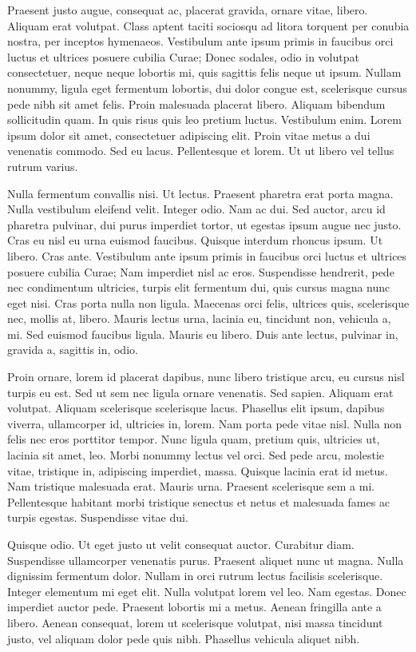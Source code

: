 \documentclass[article,colorback,accentcolor=tud4c]{tudreport}
\begin{document}
    Praesent justo augue, consequat ac, placerat gravida, ornare vitae, libero. Aliquam erat volutpat. Class aptent taciti sociosqu ad litora torquent per conubia nostra, per inceptos hymenaeos. Vestibulum ante ipsum primis in faucibus orci luctus et ultrices posuere cubilia Curae; Donec sodales, odio in volutpat consectetuer, neque neque lobortis mi, quis sagittis felis neque ut ipsum. Nullam nonummy, ligula eget fermentum lobortis, dui dolor congue est, scelerisque cursus pede nibh sit amet felis. Proin malesuada placerat libero. Aliquam bibendum sollicitudin quam. In quis risus quis leo pretium luctus. Vestibulum enim. Lorem ipsum dolor sit amet, consectetuer adipiscing elit. Proin vitae metus a dui venenatis commodo. Sed eu lacus. Pellentesque et lorem. Ut ut libero vel tellus rutrum varius.

    Nulla fermentum convallis nisi. Ut lectus. Praesent pharetra erat porta magna. Nulla vestibulum eleifend velit. Integer odio. Nam ac dui. Sed auctor, arcu id pharetra pulvinar, dui purus imperdiet tortor, ut egestas ipsum augue nec justo. Cras eu nisl eu urna euismod faucibus. Quisque interdum rhoncus ipsum. Ut libero. Cras ante. Vestibulum ante ipsum primis in faucibus orci luctus et ultrices posuere cubilia Curae; Nam imperdiet nisl ac eros. Suspendisse hendrerit, pede nec condimentum ultricies, turpis elit fermentum dui, quis cursus magna nunc eget nisi. Cras porta nulla non ligula. Maecenas orci felis, ultrices quis, scelerisque nec, mollis at, libero. Mauris lectus urna, lacinia eu, tincidunt non, vehicula a, mi. Sed euismod faucibus ligula. Mauris eu libero. Duis ante lectus, pulvinar in, gravida a, sagittis in, odio.

    Proin ornare, lorem id placerat dapibus, nunc libero tristique arcu, eu cursus nisl turpis eu est. Sed ut sem nec ligula ornare venenatis. Sed sapien. Aliquam erat volutpat. Aliquam scelerisque scelerisque lacus. Phasellus elit ipsum, dapibus viverra, ullamcorper id, ultricies in, lorem. Nam porta pede vitae nisl. Nulla non felis nec eros porttitor tempor. Nunc ligula quam, pretium quis, ultricies ut, lacinia sit amet, leo. Morbi nonummy lectus vel orci. Sed pede arcu, molestie vitae, tristique in, adipiscing imperdiet, massa. Quisque lacinia erat id metus. Nam tristique malesuada erat. Mauris urna. Praesent scelerisque sem a mi. Pellentesque habitant morbi tristique senectus et netus et malesuada fames ac turpis egestas. Suspendisse vitae dui.

    Quisque odio. Ut eget justo ut velit consequat auctor. Curabitur diam. Suspendisse ullamcorper venenatis purus. Praesent aliquet nunc ut magna. Nulla dignissim fermentum dolor. Nullam in orci rutrum lectus facilisis scelerisque. Integer elementum mi eget elit. Nulla volutpat lorem vel leo. Nam egestas. Donec imperdiet auctor pede. Praesent lobortis mi a metus. Aenean fringilla ante a libero. Aenean consequat, lorem ut scelerisque volutpat, nisi massa tincidunt justo, vel aliquam dolor pede quis nibh. Phasellus vehicula aliquet nibh.
\end{document}
